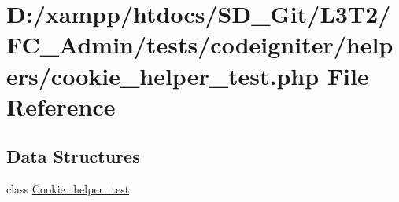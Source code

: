 \hypertarget{_admin_2tests_2codeigniter_2helpers_2cookie__helper__test_8php}{}\section{D\+:/xampp/htdocs/\+S\+D\+\_\+\+Git/\+L3\+T2/\+F\+C\+\_\+\+Admin/tests/codeigniter/helpers/cookie\+\_\+helper\+\_\+test.php File Reference}
\label{_admin_2tests_2codeigniter_2helpers_2cookie__helper__test_8php}
\subsection*{Data Structures}
\begin{DoxyCompactItemize}
\item 
class \hyperlink{class_cookie__helper__test}{Cookie\+\_\+helper\+\_\+test}
\end{DoxyCompactItemize}
